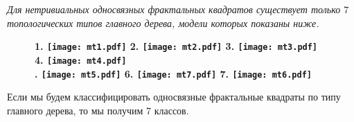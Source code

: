{\em Для нетривиальных односвязных фрактальных квадратов существует только $7$ топологических типов главного дерева, модели которых показаны ниже.}

\begin{figure}[H]
    \centering \Large {\bf
    1. \texttt{[image: mt1.pdf]}
    \hfill
    2. \texttt{[image: mt2.pdf]}
    \hfill
    3. \texttt{[image: mt3.pdf]}
    \hfill
    4. \texttt{[image: mt4.pdf]}\\
    . \texttt{[image: mt5.pdf]}
    \hfill
    6. \texttt{[image: mt7.pdf]}
    \hfill
    7. \texttt{[image: mt6.pdf]}}
\end{figure}

Если мы будем классифицировать односвязные фрактальные квадраты по типу главного дерева, то мы получим 7 классов.

